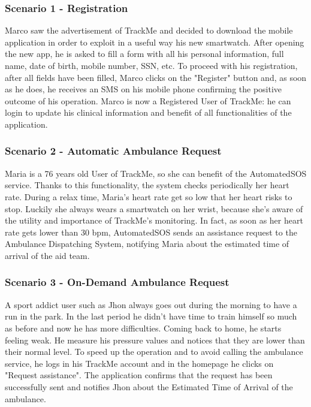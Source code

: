 \documentclass[12pt,a4paper]{article}
\begin{document}
	\subsubsection*{Scenario 1 - Registration}
		Marco saw the advertisement of TrackMe and decided to download the mobile application in order to exploit in a useful way his new smartwatch. After opening the new app, he is asked to fill a form with all his personal information, full name, date of birth, mobile number, SSN, etc. To proceed with his registration, after all fields have been filled, Marco clicks on the "Register" button and, as soon as he does, he receives an SMS on his mobile phone confirming the positive outcome of his operation. Marco is now a Registered User of TrackMe: he can login to update his clinical information and benefit of all functionalities of the application.
		
	\subsubsection*{Scenario 2 - Automatic Ambulance Request}
		Maria is a 76 years old User of TrackMe, so she can benefit of the AutomatedSOS service. Thanks to this functionality, the system checks periodically her heart rate. During a relax time, Maria's heart rate get so low that her heart risks to stop. Luckily she always wears a smartwatch on her wrist, because she's aware of the utility and importance of TrackMe's monitoring. In fact, as soon as her heart rate gets lower than 30 bpm, AutomatedSOS sends an assistance request to the Ambulance Dispatching System, notifying Maria about the estimated time of arrival of the aid team.
	
	\subsubsection*{Scenario 3 - On-Demand Ambulance Request}
		A sport addict user such as Jhon always goes out during the morning to have a run in the park. 
		In the last period he didn't have time to train himself so much as before and now he has more difficulties. Coming back to home, he starts feeling weak. He measure his pressure values and notices that they are lower than their normal level. To speed up the operation and to avoid calling the ambulance service, he logs in his TrackMe account and in the homepage he clicks on "Request assistance". The application confirms that the request has been successfully sent and notifies Jhon about the Estimated Time of Arrival of the ambulance.
	
\end{document}
